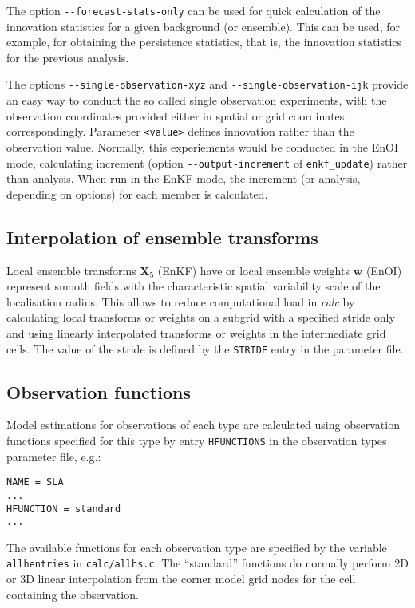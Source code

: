 \documentclass[11pt]{report}
\newcommand{\mb} {\mathbf}
\begin{document}
The option \verb|--forecast-stats-only| can be used for quick calculation of the innovation statistics for a given background (or ensemble).
This can be used, for example, for obtaining the persistence statistics, that is, the innovation statistics for the previous analysis.

The options \verb|--single-observation-xyz| and \verb|--single-observation-ijk| provide an easy way to conduct the so called single observation experiments, with the observation coordinates provided either in spatial or grid coordinates, correspondingly.
Parameter \verb|<value>| defines innovation rather than the observation value.
Normally, this experiements would be conducted in the EnOI mode, calculating increment (option \verb|--output-increment| of \verb|enkf_update|) rather than analysis.
When run in the EnKF mode, the increment (or analysis, depending on options) for each member is calculated.

\subsection{Interpolation of ensemble transforms}

Local ensemble transforms $\mb X_5$ (EnKF) have or local ensemble weights $\mb w$ (EnOI) represent smooth fields with the characteristic spatial variability scale of the localisation radius.
This allows to reduce computational load in \emph{calc} by calculating local transforms or weights on a subgrid with a specified stride only and using linearly interpolated transforms or weights in the intermediate grid cells.
The value of the stride is defined by the \verb|STRIDE| entry in the parameter file.

\subsection{Observation functions}
\label{sec:hfunctions}

Model estimations for observations of each type are calculated using observation functions specified for this type by entry \verb|HFUNCTIONS| in the observation types parameter file, e.g.:
\begin{Verbatim}[frame=single,fontsize=\footnotesize]
NAME = SLA
...
HFUNCTION = standard
...
\end{Verbatim}
The available functions for each observation type are specified by the variable \verb|allhentries| in \verb|calc/allhs.c|.
The ``standard'' functions do normally perform 2D or 3D linear interpolation from the corner model grid nodes for the cell containing the observation.
\end{document}
